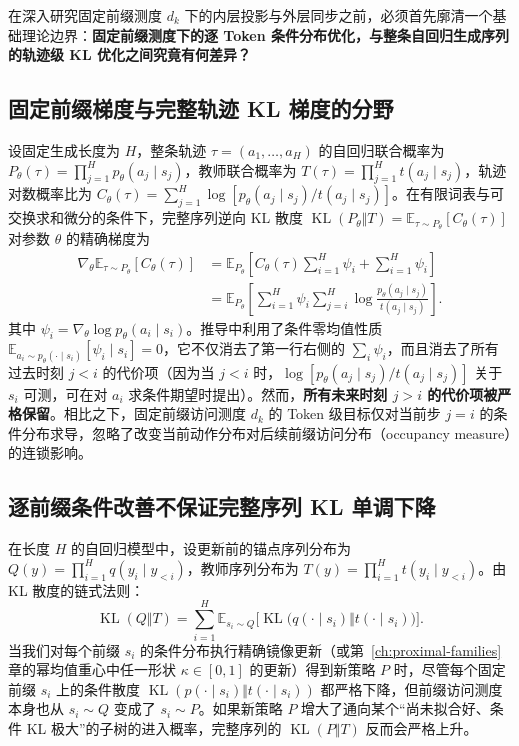\documentclass[lang=cn,scheme=chinese,openany]{elegantbook}
\newcommand{\E}{\mathbb E}
\newcommand{\KL}{\operatorname{KL}}
\begin{document}
在深入研究固定前缀测度 $d_k$ 下的内层投影与外层同步之前，必须首先廓清一个基础理论边界：\textbf{固定前缀测度下的逐 Token 条件分布优化，与整条自回归生成序列的轨迹级 KL 优化之间究竟有何差异？}

\subsection{固定前缀梯度与完整轨迹 KL 梯度的分野}

设固定生成长度为 $H$，整条轨迹 $\tau=(a_1,\ldots,a_H)$ 的自回归联合概率为 $P_\theta(\tau)=\prod_{j=1}^H p_\theta(a_j\mid s_j)$，教师联合概率为 $T(\tau)=\prod_{j=1}^H t(a_j\mid s_j)$，轨迹对数概率比为 $C_\theta(\tau)=\sum_{j=1}^H\log[p_\theta(a_j\mid s_j)/t(a_j\mid s_j)]$。在有限词表与可交换求和微分的条件下，完整序列逆向 KL 散度 $\KL(P_\theta\Vert T)=\E_{\tau\sim P_\theta}[C_\theta(\tau)]$ 对参数 $\theta$ 的精确梯度为
\begin{align}
\nabla_\theta\E_{\tau\sim P_\theta}[C_\theta(\tau)]
&=\E_{P_\theta}\left[C_\theta(\tau)\sum_{i=1}^H\psi_i+\sum_{i=1}^H\psi_i\right]\nonumber\\
&=\E_{P_\theta}\left[\sum_{i=1}^H\psi_i\sum_{j=i}^H
\log\frac{p_\theta(a_j\mid s_j)}{t(a_j\mid s_j)}\right].
\label{eq:trajectory-kl-exact-grad}
\end{align}
其中 $\psi_i=\nabla_\theta\log p_\theta(a_i\mid s_i)$。推导中利用了条件零均值性质 $\E_{a_i\sim p_\theta(\cdot\mid s_i)}[\psi_i\mid s_i]=0$，它不仅消去了第一行右侧的 $\sum_i\psi_i$，而且消去了所有过去时刻 $j<i$ 的代价项（因为当 $j<i$ 时，$\log[p_\theta(a_j\mid s_j)/t(a_j\mid s_j)]$ 关于 $s_i$ 可测，可在对 $a_i$ 求条件期望时提出）。然而，\textbf{所有未来时刻 $j>i$ 的代价项被严格保留}。相比之下，固定前缀访问测度 $d_k$ 的 Token 级目标仅对当前步 $j=i$ 的条件分布求导，忽略了改变当前动作分布对后续前缀访问分布（occupancy measure）的连锁影响。

\subsection{逐前缀条件改善不保证完整序列 KL 单调下降}

在长度 $H$ 的自回归模型中，设更新前的锚点序列分布为 $Q(y)=\prod_{i=1}^H q(y_i\mid y_{<i})$，教师序列分布为 $T(y)=\prod_{i=1}^H t(y_i\mid y_{<i})$。由 KL 散度的链式法则：
\begin{equation}
 \KL(Q\Vert T)=\sum_{i=1}^H\E_{s_i\sim Q}\bigl[\KL\bigl(q(\cdot\mid s_i)\Vert t(\cdot\mid s_i)\bigr)\bigr].
 \label{eq:proximal-sequence-chain}
\end{equation}
当我们对每个前缀 $s_i$ 的条件分布执行精确镜像更新（或第~\ref{ch:proximal-families} 章的幂均值重心中任一形状 $\kappa\in[0,1]$ 的更新）得到新策略 $P$ 时，尽管每个固定前缀 $s_i$ 上的条件散度 $\KL(p(\cdot\mid s_i)\Vert t(\cdot\mid s_i))$ 都严格下降，但前缀访问测度本身也从 $s_i\sim Q$ 变成了 $s_i\sim P$。如果新策略 $P$ 增大了通向某个“尚未拟合好、条件 KL 极大”的子树的进入概率，完整序列的 $\KL(P\Vert T)$ 反而会严格上升。
\end{document}
